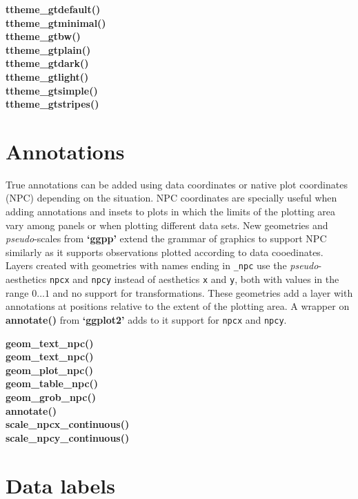 \documentclass[DIV=25,a3,landscape,9pt]{scrartcl}\usepackage[]{graphicx}\usepackage[]{xcolor}
\begin{document}
\begin{multicols}{3}
\noindent
\textbf{ttheme\_gtdefault()}\\
\textbf{ttheme\_gtminimal()}\\
\textbf{ttheme\_gtbw()}\\
\textbf{ttheme\_gtplain()}\\
\textbf{ttheme\_gtdark()}\\
\textbf{ttheme\_gtlight()}\\
\textbf{ttheme\_gtsimple()}\\
\textbf{ttheme\_gtstripes()}

\section*{Annotations}

True annotations can be added using data coordinates or native plot coordinates (NPC) depending on the situation. NPC coordinates are specially useful when adding annotations and insets to plots in which the limits of the plotting area vary among panels or when plotting different data sets. New geometries and \emph{pseudo}-scales from \textbf{`ggpp'} extend the grammar of graphics to support NPC similarly as it supports observations plotted according to data cooedinates. Layers created with geometries with names ending in \texttt{\_npc} use the \emph{pseudo}-aesthetics \texttt{npcx} and \texttt{npcy} instead of aesthetics \texttt{x} and \texttt{y}, both with values in the range $0\ldots1$ and no support for transformations. These geometries add a layer with annotations at positions relative to the extent of the plotting area. A wrapper on \textbf{annotate()} from \textbf{`ggplot2'} adds to it support for \texttt{npcx} and \texttt{npcy}\textbf{}.\vspace{1ex}

\noindent
\textbf{geom\_text\_npc()}\\
\textbf{geom\_text\_npc()}\\
\textbf{geom\_plot\_npc()}\\
\textbf{geom\_table\_npc()}\\
\textbf{geom\_grob\_npc()}\\
\textbf{annotate()}\\
\textbf{scale\_npcx\_continuous()}\\
\textbf{scale\_npcy\_continuous()}

\section*{Data labels}


\end{multicols}
\end{document}
